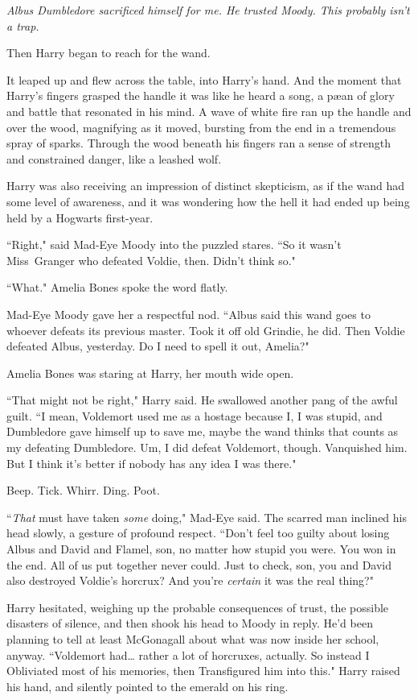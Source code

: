 \emph{Albus Dumbledore sacrificed himself for me. He trusted Moody. This probably isn't a trap.}

Then Harry began to reach for the wand.

It leaped up and flew across the table, into Harry's hand. And the moment that Harry's fingers grasped the handle it was like he heard a song, a pæan of glory and battle that resonated in his mind. A wave of white fire ran up the handle and over the wood, magnifying as it moved, bursting from the end in a tremendous spray of sparks. Through the wood beneath his fingers ran a sense of strength and constrained danger, like a leashed wolf.

Harry was also receiving an impression of distinct skepticism, as if the wand had some level of awareness, and it was wondering how the hell it had ended up being held by a Hogwarts first-year.

``Right," said Mad-Eye Moody into the puzzled stares. ``So it wasn't Miss~Granger who defeated Voldie, then. Didn't think so."

``What." Amelia Bones spoke the word flatly.

Mad-Eye Moody gave her a respectful nod. ``Albus said this wand goes to whoever defeats its previous master. Took it off old Grindie, he did. Then Voldie defeated Albus, yesterday. Do I need to spell it out, Amelia?"

Amelia Bones was staring at Harry, her mouth wide open.

``That might not be right," Harry said. He swallowed another pang of the awful guilt. ``I mean, Voldemort used me as a hostage because I, I was stupid, and Dumbledore gave himself up to save me, maybe the wand thinks that counts as my defeating Dumbledore. Um, I did defeat Voldemort, though. Vanquished him. But I think it's better if nobody has any idea I was there."

Beep. Tick. Whirr. Ding. Poot.

``\emph{That} must have taken \emph{some} doing," Mad-Eye said. The scarred man inclined his head slowly, a gesture of profound respect. ``Don't feel too guilty about losing Albus and David and Flamel, son, no matter how stupid you were. You won in the end. All of us put together never could. Just to check, son, you and David also destroyed Voldie's horcrux? And you're \emph{certain} it was the real thing?"

Harry hesitated, weighing up the probable consequences of trust, the possible disasters of silence, and then shook his head to Moody in reply. He'd been planning to tell at least McGonagall about what was now inside her school, anyway. ``Voldemort had{\ldots} rather a lot of horcruxes, actually. So instead I Obliviated most of his memories, then Transfigured him into this." Harry raised his hand, and silently pointed to the emerald on his ring.

